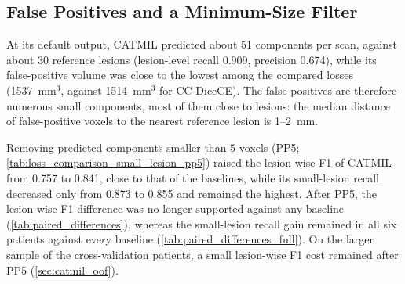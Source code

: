 \subsection{False Positives and a Minimum-Size Filter}
\label{sec:fp_pp}

At its default output, CATMIL predicted about 51 components per scan,
against about 30 reference lesions (lesion-level recall 0.909, precision
0.674), while its false-positive volume was close to the lowest among the
compared losses (1537~mm$^3$, against 1514~mm$^3$ for CC-DiceCE). The false positives are therefore numerous small components, most of
them close to lesions: the median distance of false-positive voxels to the
nearest reference lesion is 1--2~mm.

Removing predicted components smaller than 5 voxels (PP5;
\cref{tab:loss_comparison_small_lesion_pp5}) raised the lesion-wise F1 of
CATMIL from 0.757 to 0.841, close to that of the baselines, while its
small-lesion recall decreased only from 0.873 to 0.855 and remained the
highest. After PP5, the lesion-wise F1 difference was no longer supported
against any baseline (\cref{tab:paired_differences}), whereas the
small-lesion recall gain remained in all six patients against every
baseline (\cref{tab:paired_differences_full}). On the larger sample of the
cross-validation patients, a small lesion-wise F1 cost remained after PP5
(\cref{sec:catmil_oof}).

